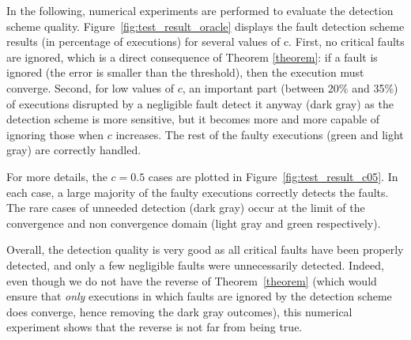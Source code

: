 In the following, numerical experiments are performed to evaluate the detection scheme quality. Figure~\ref{fig:test_result_oracle} displays the fault detection scheme results (in percentage of executions) for several values of c.
First, no critical faults are ignored, which is a direct consequence of Theorem \ref{theorem}: if a fault is ignored (the error is smaller than the threshold), then the execution must converge. Second, for low values of $c$, an important part (between 20\% and 35\%) of executions disrupted by a negligible fault detect it anyway (dark gray) as the detection scheme is more sensitive, but it becomes more and more capable of ignoring those when $c$ increases. The rest of the faulty executions (green and light gray) are correctly handled.

For more details, the $c=0.5$ cases are plotted in Figure~\ref{fig:test_result_c05}. In each case, a large majority of the faulty executions correctly detects the faults. The rare cases of unneeded detection (dark gray) occur at the limit of the convergence and non convergence domain (light gray and green respectively).

Overall, the detection quality is very good as all critical faults have been properly detected, and only a few negligible faults were unnecessarily detected. Indeed, even though we do not have the reverse of Theorem~\ref{theorem} (which would ensure that \emph{only} executions in which faults are ignored by the detection scheme does converge, hence removing the dark gray outcomes), this numerical experiment shows that the reverse is not far from being true.






